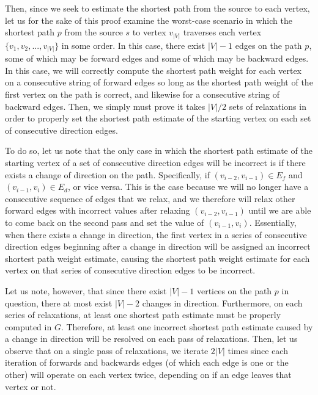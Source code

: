 \documentclass[11pt]{article}
\begin{document}
Then, since we seek to estimate the shortest path from the source to each vertex, let us for the sake of this proof examine the worst-case scenario in which the shortest path $p$ from the source $s$ to vertex $v_{|V|}$ traverses each vertex $\{v_1, v_2, ..., v_{|V|}\}$ in some order. In this case, there exist $|V| - 1$ edges on the path $p$, some of which may be forward edges and some of which may be backward edges. In this case, we will correctly compute the shortest path weight for each vertex on a consecutive string of forward edges so long as the shortest path weight of the first vertex on the path is correct, and likewise for a consecutive string of backward edges. Then, we simply must prove it takes $|V| / 2$ sets of relaxations in order to properly set the shortest path estimate of the starting vertex on each set of consecutive direction edges.

To do so, let us note that the only case in which the shortest path estimate of the starting vertex of a set of consecutive direction edges will be incorrect is if there exists a change of direction on the path. Specifically, if $(v_{i-2}, v_{i-1}) \in E_f$ and $(v_{i-1}, v_i) \in E_d$, or vice versa. This is the case because we will no longer have a consecutive sequence of edges that we relax, and we therefore will relax other forward edges with incorrect values after relaxing $(v_{i-2}, v_{i-1})$ until we are able to come back on the second pass and set the value of $(v_{i-1}, v_i)$. Essentially, when there exists a change in direction, the first vertex in a series of consecutive direction edges beginning after a change in direction will be assigned an incorrect shortest path weight estimate, causing the shortest path weight estimate for each vertex on that series of consecutive direction edges to be incorrect.

Let us note, however, that since there exist $|V| - 1$ vertices on the path $p$ in question, there at most exist $|V| - 2$ changes in direction. Furthermore, on each series of relaxations, at least one shortest path estimate must be properly computed in $G$. Therefore, at least one incorrect shortest path estimate caused by a change in direction will be resolved on each pass of relaxations. Then, let us observe that on a single pass of relaxations, we iterate $2|V|$ times since each iteration of forwards and backwards edges (of which each edge is one or the other) will operate on each vertex twice, depending on if an edge leaves that vertex or not.
\end{document}
